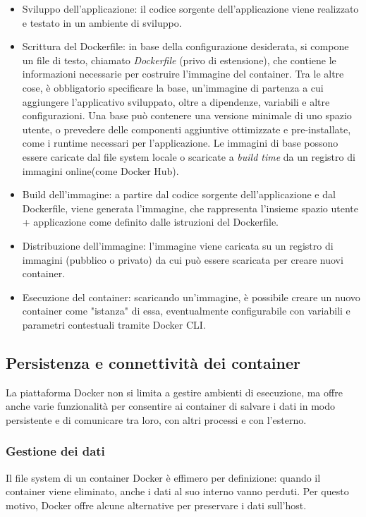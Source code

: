 \begin{itemize}
    \item Sviluppo dell'applicazione: il codice sorgente dell'applicazione viene realizzato e testato in un ambiente di sviluppo.
    \item Scrittura del Dockerfile: in base della configurazione desiderata, si compone un file di testo, chiamato \emph{Dockerfile} (privo di estensione), che contiene le informazioni necessarie per costruire l'immagine del container. Tra le altre cose, è obbligatorio specificare la base, un'immagine di partenza a cui aggiungere l'applicativo sviluppato, oltre a dipendenze, variabili e altre configurazioni. Una base può contenere una versione minimale di uno spazio utente, o prevedere delle componenti aggiuntive ottimizzate e pre-installate, come i runtime necessari per l'applicazione. Le immagini di base possono essere caricate dal file system locale o scaricate a \emph{build time} da un registro di immagini online(come Docker Hub).
    \item Build dell'immagine: a partire dal codice sorgente dell'applicazione e dal Dockerfile, viene generata l'immagine, che rappresenta l'insieme spazio utente + applicazione come definito dalle istruzioni del Dockerfile.
    \item Distribuzione dell'immagine: l'immagine viene caricata su un registro di immagini (pubblico o privato) da cui può essere scaricata per creare nuovi container.
    \item Esecuzione del container: scaricando un'immagine, è possibile creare un nuovo container come "istanza" di essa, eventualmente configurabile con variabili e parametri contestuali tramite Docker CLI.
\end{itemize}

\subsection{Persistenza e connettività dei container}
La piattaforma Docker non si limita a gestire ambienti di esecuzione, ma offre anche varie funzionalità per consentire ai container di salvare i dati in modo persistente e di comunicare tra loro, con altri processi e con l'esterno.

\subsubsection{Gestione dei dati}
Il file system di un container Docker è effimero per definizione: quando il container viene eliminato, anche i dati al suo interno vanno perduti. Per questo motivo, Docker offre alcune alternative per preservare i dati sull'host.


